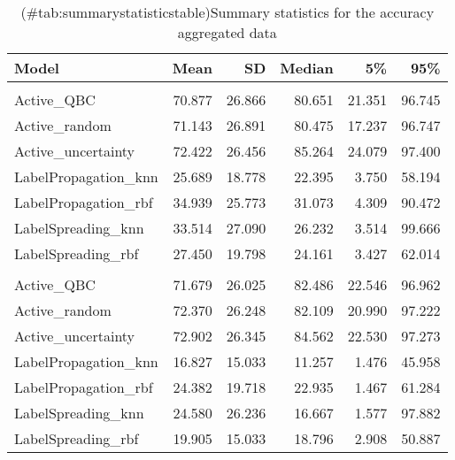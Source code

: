 \begin{table}[!h]

\caption{(\#tab:summarystatisticstable)Summary statistics for the accuracy aggregated data}
\centering
\begin{tabular}[t]{lrrrrr}
\toprule
Model & Mean & SD & Median & 5\% & 95\%\\
\midrule
\addlinespace[0.3em]
\multicolumn{6}{l}{\textbf{10\% labels available}}\\
\hspace{1em}Active\_QBC & 70.877 & 26.866 & 80.651 & 21.351 & 96.745\\
\hspace{1em}Active\_random & 71.143 & 26.891 & 80.475 & 17.237 & 96.747\\
\hspace{1em}Active\_uncertainty & 72.422 & 26.456 & 85.264 & 24.079 & 97.400\\
\hspace{1em}LabelPropagation\_knn & 25.689 & 18.778 & 22.395 & 3.750 & 58.194\\
\hspace{1em}LabelPropagation\_rbf & 34.939 & 25.773 & 31.073 & 4.309 & 90.472\\
\hspace{1em}LabelSpreading\_knn & 33.514 & 27.090 & 26.232 & 3.514 & 99.666\\
\hspace{1em}LabelSpreading\_rbf & 27.450 & 19.798 & 24.161 & 3.427 & 62.014\\
\addlinespace[0.3em]
\multicolumn{6}{l}{\textbf{50\% labels available}}\\
\hspace{1em}Active\_QBC & 71.679 & 26.025 & 82.486 & 22.546 & 96.962\\
\hspace{1em}Active\_random & 72.370 & 26.248 & 82.109 & 20.990 & 97.222\\
\hspace{1em}Active\_uncertainty & 72.902 & 26.345 & 84.562 & 22.530 & 97.273\\
\hspace{1em}LabelPropagation\_knn & 16.827 & 15.033 & 11.257 & 1.476 & 45.958\\
\hspace{1em}LabelPropagation\_rbf & 24.382 & 19.718 & 22.935 & 1.467 & 61.284\\
\hspace{1em}LabelSpreading\_knn & 24.580 & 26.236 & 16.667 & 1.577 & 97.882\\
\hspace{1em}LabelSpreading\_rbf & 19.905 & 15.033 & 18.796 & 2.908 & 50.887\\
\bottomrule
\end{tabular}
\end{table}

